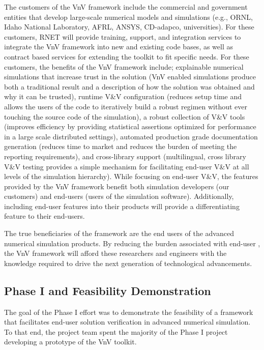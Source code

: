 The customers of the VnV framework include the commercial and government entities that develop large-scale numerical models and simulations (e.g., ORNL, Idaho National Laboratory, AFRL, ANSYS, CD-adapco, universities). For these customers, RNET will provide training, support, and integration services to integrate the VnV framework into new and existing code bases, as well as contract based services for extending the toolkit to fit specific needs. For these customers, the benefits of the VnV framework include; explainable numerical simulations that increase trust in the solution (VnV enabled simulations produce both a traditional result and a description of how the solution was obtained and why it can be trusted), runtime V\&V configuration (reduces setup time and allows the users of the code to iteratively build a robust \VV regimen without ever touching the source code of the simulation), a robust collection of V\&V tools (improves efficiency by providing statistical assertions optimized for performance in a large scale distributed settings), automated production grade documentation generation (reduces time to market and reduces the burden of meeting the \VV reporting requirements), and cross-library support (multilingual, cross library V\&V testing provides a simple mechanism for facilitating end-user V\&V at all levels of the simulation hierarchy). While focusing on end-user V\&V, the features provided by the VnV framework benefit both simulation developers (our customers) and end-users (users of the simulation software). Additionally, including end-user \VV features into their products will provide a differentiating feature to their end-users. 

The true beneficiaries of the \VV framework are the end users of the advanced numerical simulation products. By reducing the burden associated with end-user \VV, the VnV framework will afford these researchers and engineers with the knowledge required to drive the next generation of technological advancements. 

\subsection{Phase I and Feasibility Demonstration}

The goal of the Phase I effort was to demonstrate the feasibility of a framework that facilitates end-user solution
verification in advanced numerical simulation. To that end, the project team spent the majority of the Phase I
project developing a prototype of the VnV toolkit.

